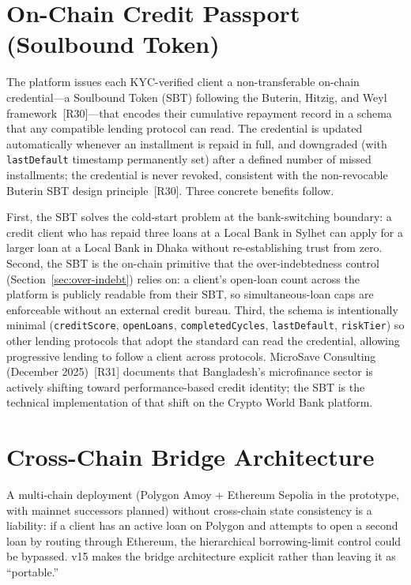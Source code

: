 \documentclass[12pt,a4paper]{report}
\begin{document}
\section{On-Chain Credit Passport (Soulbound Token)}
\label{sec:credit-passport}

The platform issues each KYC-verified client a non-transferable on-chain credential---a Soulbound Token (SBT) following the Buterin, Hitzig, and Weyl framework~[R30]---that encodes their cumulative repayment record in a schema that any compatible lending protocol can read. The credential is updated automatically whenever an installment is repaid in full, and downgraded (with \texttt{lastDefault} timestamp permanently set) after a defined number of missed installments; the credential is never revoked, consistent with the non-revocable Buterin SBT design principle~[R30]. Three concrete benefits follow.

First, the SBT solves the cold-start problem at the bank-switching boundary: a credit client who has repaid three loans at a Local Bank in Sylhet can apply for a larger loan at a Local Bank in Dhaka without re-establishing trust from zero. Second, the SBT is the on-chain primitive that the over-indebtedness control (Section~\ref{sec:over-indebt}) relies on: a client's open-loan count across the platform is publicly readable from their SBT, so simultaneous-loan caps are enforceable without an external credit bureau. Third, the schema is intentionally minimal (\texttt{creditScore}, \texttt{openLoans}, \texttt{completedCycles}, \texttt{lastDefault}, \texttt{riskTier}) so other lending protocols that adopt the standard can read the credential, allowing progressive lending to follow a client across protocols. MicroSave Consulting (December 2025)~[R31] documents that Bangladesh's microfinance sector is actively shifting toward performance-based credit identity; the SBT is the technical implementation of that shift on the Crypto World Bank platform.

\section{Cross-Chain Bridge Architecture}
\label{sec:bridge}

A multi-chain deployment (Polygon Amoy + Ethereum Sepolia in the prototype, with mainnet successors planned) without cross-chain state consistency is a liability: if a client has an active loan on Polygon and attempts to open a second loan by routing through Ethereum, the hierarchical borrowing-limit control could be bypassed. v15 makes the bridge architecture explicit rather than leaving it as ``portable.''
\end{document}

